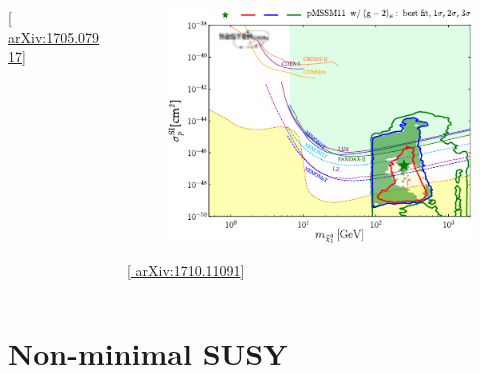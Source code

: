 \documentclass[10pt,aspectratio=169]{beamer}
\begin{document}
\begin{frame}
\begin{columns}[t]
\begin{column}{0.5\textwidth}
\begin{columns}[t]
\begin{column}{0.5\textwidth}
          \begin{center}
            { \tiny [\href{http://arxiv.org/abs/1705.07917}{%
                  arXiv:1705.07917}] }
          \end{center}
        \end{column}
        \begin{column}{0.5\textwidth}
          \vspace{-20pt}
          \begin{figure}
            \hspace{-15pt}
            \includegraphics[width=\textwidth]{mastercode_direct_detection}
          \end{figure}
          \vspace{-20pt}
          \begin{center}
            { \tiny [\href{http://arxiv.org/abs/1710.11091}{%
                  arXiv:1710.11091}] }
          \end{center}
        \end{column}
      \end{columns}
    \end{column}
  \end{columns}
\end{frame}

\section{Non-minimal SUSY}
\end{document}
